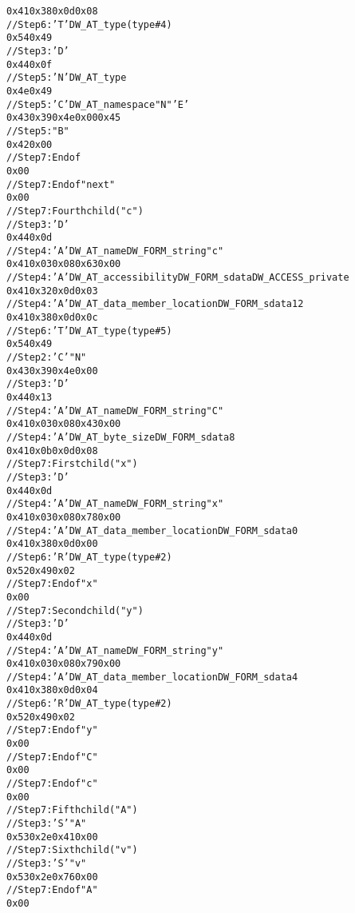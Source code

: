 \begin{alltt}
    0x41 0x38 0x0d 0x08
    // Step 6: 'T' DW\_AT\_type (type \#4)
    0x54 0x49
        // Step 3: 'D' 
0x44 0x0f
        // Step 5: 'N' DW\_AT\_type
        0x4e 0x49
        // Step 5: 'C' DW\_AT\_namespace "N" 'E'
        0x43 0x39 0x4e 0x00 0x45
        // Step 5: "B"
        0x42 0x00
        // Step 7: End of 
        0x00
    // Step 7: End of  "next"
    0x00
// Step 7: Fourth child ("c")
    // Step 3: 'D' 
    0x44 0x0d
    // Step 4: 'A' DW\_AT\_name DW\_FORM\_string "c"
    0x41 0x03 0x08 0x63 0x00
    // Step 4: 'A' DW\_AT\_accessibility DW\_FORM\_sdata DW\_ACCESS\_private
    0x41 0x32 0x0d 0x03
    // Step 4: 'A' DW\_AT\_data\_member\_location DW\_FORM\_sdata 12
    0x41 0x38 0x0d 0x0c
    // Step 6: 'T' DW\_AT\_type (type \#5)
    0x54 0x49
        // Step 2: 'C'  "N"
        0x43 0x39 0x4e 0x00
        // Step 3: 'D' 
        0x44 0x13
        // Step 4: 'A' DW\_AT\_name DW\_FORM\_string "C"
        0x41 0x03 0x08 0x43 0x00
        // Step 4: 'A' DW\_AT\_byte\_size DW\_FORM\_sdata 8
        0x41 0x0b 0x0d 0x08
        // Step 7: First child ("x")
            // Step 3: 'D' 
            0x44 0x0d
            // Step 4: 'A' DW\_AT\_name DW\_FORM\_string "x"
            0x41 0x03 0x08 0x78 0x00
            // Step 4: 'A' DW\_AT\_data\_member\_location DW\_FORM\_sdata 0
            0x41 0x38 0x0d 0x00
            // Step 6: 'R' DW\_AT\_type (type \#2)
            0x52 0x49 0x02
            // Step 7: End of  "x"
            0x00
        // Step 7: Second child ("y")
            // Step 3: 'D' 
            0x44 0x0d
            // Step 4: 'A' DW\_AT\_name DW\_FORM\_string "y"
            0x41 0x03 0x08 0x79 0x00
            // Step 4: 'A' DW\_AT\_data\_member\_location DW\_FORM\_sdata 4
            0x41 0x38 0x0d 0x04
            // Step 6: 'R' DW\_AT\_type (type \#2)
            0x52 0x49 0x02
            // Step 7: End of  "y"
            0x00
        // Step 7: End of  "C"
        0x00
    // Step 7: End of  "c"
    0x00
// Step 7: Fifth child ("A")
    // Step 3: 'S'  "A"
    0x53 0x2e 0x41 0x00
// Step 7: Sixth child ("v")
    // Step 3: 'S'  "v"
    0x53 0x2e 0x76 0x00
// Step 7: End of  "A"
0x00
\end{alltt}

